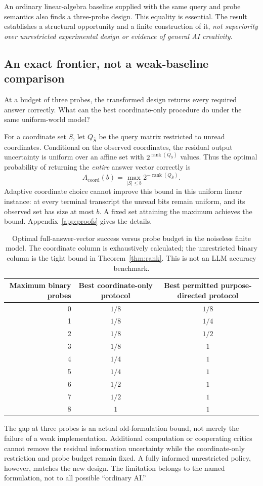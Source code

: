 \documentclass[11pt,letterpaper]{article}
\DeclareMathOperator{\rank}{rank}\DeclareMathOperator{\spanop}{span}
\theoremstyle{remark}\newtheorem{remark}{Remark}[section]
\begin{document}
An ordinary linear-algebra baseline supplied with the same query and probe semantics also finds a three-probe design. This equality is essential. The result establishes a structural opportunity and a finite construction of it, \emph{not superiority over unrestricted experimental design or evidence of general AI creativity}.

\subsection{An exact frontier, not a weak-baseline comparison}
At a budget of three probes, the transformed design returns every required answer correctly. What can the best coordinate-only procedure do under the same uniform-world model?

For a coordinate set $S$, let $Q_{\overline S}$ be the query matrix restricted to unread coordinates. Conditional on the observed coordinates, the residual output uncertainty is uniform over an affine set with $2^{\rank(Q_{\overline S})}$ values. Thus the optimal probability of returning the \emph{entire} answer vector correctly is
\begin{equation}\label{eq:coordinate}
 A_{\mathrm{coord}}(b)=\max_{|S|\le b}2^{-\rank(Q_{\overline S})}.
\end{equation}
Adaptive coordinate choice cannot improve this bound in this uniform linear instance: at every terminal transcript the unread bits remain uniform, and its observed set has size at most $b$. A fixed set attaining the maximum achieves the bound. Appendix~\ref{app:proofs} gives the details.

\begin{table}[htbp]
\centering\small
\caption{Optimal full-answer-vector success versus probe budget in the noiseless finite model. The coordinate column is exhaustively calculated; the unrestricted binary column is the tight bound in Theorem~\ref{thm:rank}. This is not an LLM accuracy benchmark.}
\begin{tabular}{@{}rcc@{}}
\toprule
Maximum binary probes & Best coordinate-only protocol & Best permitted purpose-directed protocol\\
\midrule
0 & $1/8$ & $1/8$\\
1 & $1/8$ & $1/4$\\
2 & $1/8$ & $1/2$\\
3 & $1/8$ & $1$\\
4 & $1/4$ & $1$\\
5 & $1/4$ & $1$\\
6 & $1/2$ & $1$\\
7 & $1/2$ & $1$\\
8 & $1$ & $1$\\
\bottomrule
\end{tabular}
\label{tab:frontier}
\end{table}
The gap at three probes is an actual old-formulation bound, not merely the failure of a weak implementation. Additional computation or cooperating critics cannot remove the residual information uncertainty while the coordinate-only restriction and probe budget remain fixed. A fully informed unrestricted policy, however, matches the new design. The limitation belongs to the named formulation, not to all possible ``ordinary AI.''
\end{document}
